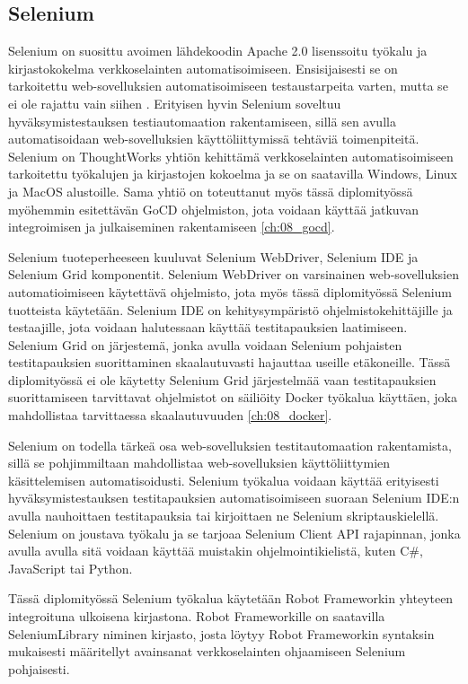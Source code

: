   \subsection{Selenium} \label{ch:08_selenium}

    Selenium on suosittu avoimen lähdekoodin Apache 2.0 lisenssoitu työkalu ja kirjastokokelma verkkoselainten automatisoimiseen.
    Ensisijaisesti se on tarkoitettu web-sovelluksien automatisoimiseen testaustarpeita varten, mutta se ei ole rajattu vain siihen \parencite{noauthor_selenium_nodate}.
    Erityisen hyvin Selenium soveltuu hyväksymistestauksen testiautomaation rakentamiseen, sillä sen avulla automatisoidaan web-sovelluksien käyttöliittymissä tehtäviä toimenpiteitä.
    Selenium on ThoughtWorks yhtiön kehittämä verkkoselainten automatisoimiseen tarkoitettu työkalujen ja kirjastojen kokoelma ja se on saatavilla Windows, Linux ja MacOS alustoille.
    Sama yhtiö on toteuttanut myös tässä diplomityössä myöhemmin esitettävän GoCD ohjelmiston, jota voidaan käyttää jatkuvan integroimisen ja julkaiseminen rakentamiseen \ref{ch:08_gocd}.

    Selenium tuoteperheeseen kuuluvat Selenium WebDriver, Selenium IDE ja Selenium Grid komponentit.
    Selenium WebDriver on varsinainen web-sovelluksien automatioimiseen käytettävä ohjelmisto, jota myös tässä diplomityössä Selenium tuotteista käytetään.
    Selenium IDE on kehitysympäristö ohjelmistokehittäjille ja testaajille, jota voidaan halutessaan käyttää testitapauksien laatimiseen.
    Selenium Grid on järjestemä, jonka avulla voidaan Selenium pohjaisten testitapauksien suorittaminen skaalautuvasti hajauttaa useille etäkoneille.
    Tässä diplomityössä ei ole käytetty Selenium Grid järjestelmää vaan testitapauksien suorittamiseen tarvittavat ohjelmistot on säiliöity Docker työkalua käyttäen, joka mahdollistaa tarvittaessa skaalautuvuuden \ref{ch:08_docker}.

    Selenium on todella tärkeä osa web-sovelluksien testitautomaation rakentamista, sillä se pohjimmiltaan mahdollistaa web-sovelluksien käyttöliittymien käsittelemisen automatisoidusti.
    Selenium työkalua voidaan käyttää erityisesti hyväksymistestauksen testitapauksien automatisoimiseen suoraan Selenium IDE:n avulla nauhoittaen testitapauksia tai kirjoittaen ne Selenium skriptauskielellä.
    Selenium on joustava työkalu ja se tarjoaa Selenium Client API rajapinnan, jonka avulla avulla sitä voidaan käyttää muistakin ohjelmointikielistä, kuten C\#, JavaScript tai Python.

    Tässä diplomityössä Selenium työkalua käytetään Robot Frameworkin yhteyteen integroituna ulkoisena kirjastona.
    Robot Frameworkille on saatavilla SeleniumLibrary niminen kirjasto, josta löytyy Robot Frameworkin syntaksin mukaisesti määritellyt avainsanat verkkoselainten ohjaamiseen Selenium pohjaisesti.

